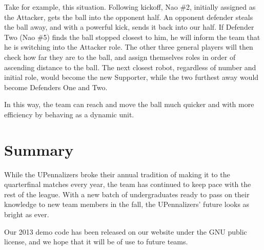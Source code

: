 \documentclass{article}
\begin{document}
		Take for example, this situation. Following kickoff, Nao \#2, initially assigned as the Attacker, gets the ball into the opponent half. An opponent defender steals the ball away, and with a powerful kick, sends it back into our half. If Defender Two (Nao \#5) finds the ball stopped closest to him, he will inform the team that he is switching into the Attacker role. The other three general players will then check how far they are to the ball, and assign themselves roles in order of ascending distance to the ball. The next closest robot, regardless of number and initial role, would become the new Supporter, while the two furthest away would become Defenders One and Two.

    In this way, the team can reach and move the ball much quicker and with more efficiency by behaving as a dynamic unit.

	

\section{Summary}
	While the UPennalizers broke their annual tradition of making it to the quarterfinal matches every year, the team has continued to keep pace with the rest of the league. With a new batch of undergraduates ready to pass on their knowledge to new team members in the fall, the UPennalizers' future looks as bright as ever.

	Our 2013 demo code has been released on our website under the GNU public license, and we hope that it will be of use to future teams.
\end{document}
